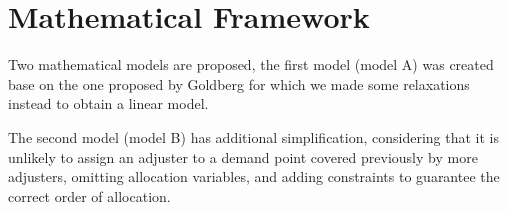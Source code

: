 \section{Mathematical Framework}

Two mathematical models are proposed,
the first model (model A) was created
base on the one proposed by Goldberg \cite{goldberg1990validating}
for which
we made some relaxations
instead to obtain a linear model.

The second model (model B)
has additional simplification,
considering that
it is unlikely
to assign an adjuster
to a demand point
covered previously
by more adjusters,
omitting allocation variables,
and adding constraints
to guarantee
the correct order of allocation.
